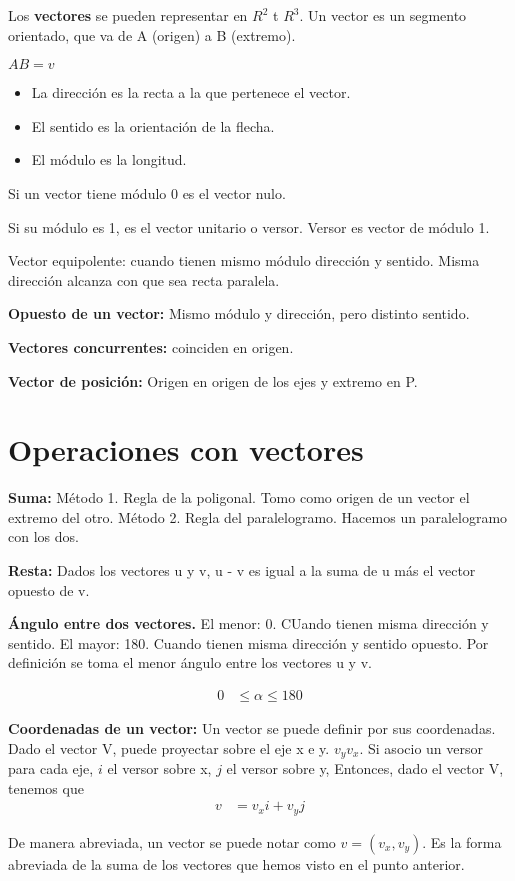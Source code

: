 \documentclass{article}
\begin{document}
Los \textbf{vectores} se pueden representar en $R^2$ t $R^3$. Un vector es un segmento
orientado, que va de A (origen) a B (extremo).

$AB = v$

\begin{itemize}
    \item La dirección es la recta a la que pertenece el vector.
    \item El sentido es la orientación de la flecha.
    \item El módulo es la longitud.
\end{itemize}

Si un vector tiene módulo 0 es el vector nulo.

Si su módulo es 1, es el vector unitario o versor. Versor es
vector de módulo 1.

Vector equipolente: cuando tienen mismo módulo dirección y sentido. Misma dirección
alcanza con que sea recta paralela.

\textbf{Opuesto de un vector: } Mismo módulo y dirección, pero distinto sentido.

\textbf{Vectores concurrentes: } coinciden en origen.

\textbf{Vector de posición: } Origen en origen de los ejes y extremo en P.

\section*{Operaciones con vectores}

\textbf{Suma: } Método 1. Regla de la poligonal.
Tomo como origen de un vector el extremo del otro.
Método 2. Regla del paralelogramo. Hacemos un paralelogramo con los dos.

\textbf{Resta: } Dados los vectores u y v, u - v es igual a la suma de u más el
vector opuesto de v.

\textbf{Ángulo entre dos vectores. } El menor: 0. CUando tienen misma dirección y
sentido. El mayor: 180. Cuando tienen misma dirección y sentido opuesto. Por definición
se toma el menor ángulo entre los vectores u y v.

\begin{align*}
    0 &\leq \alpha \leq 180
\end{align*}

\textbf{Coordenadas de un vector: } Un vector se puede definir por sus coordenadas.
Dado el vector V, puede proyectar sobre el eje x e y. $v_y v_x$.
Si asocio un versor para cada eje, $i$ el versor sobre x, $j$ el versor sobre y,
Entonces, dado el vector V, tenemos que 
\begin{align}
    v &= v_xi + v_yj
\end{align}

De manera abreviada, un vector se puede notar como $v=(v_x,v_y)$. Es la forma
abreviada de la suma de los vectores que hemos visto en el punto anterior.
\end{document}
